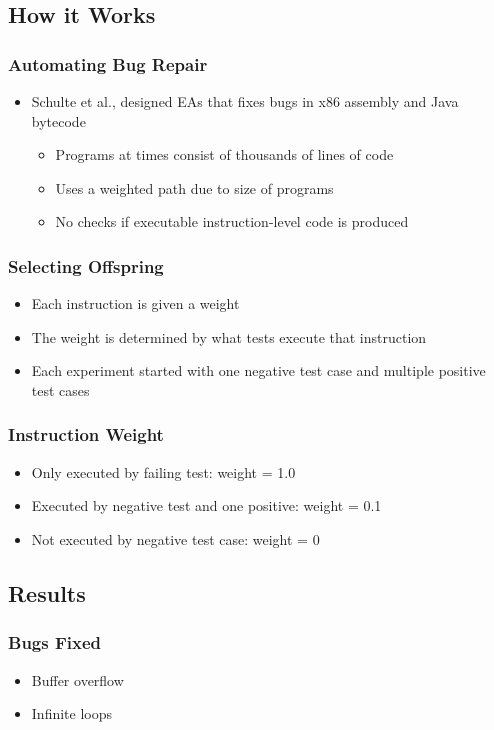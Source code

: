\documentclass{beamer}
\begin{document}
\subsection{How it Works}
\begin{frame}
  \frametitle{Automating Bug Repair}
  \begin{itemize}
  \item Schulte et al., designed EAs that fixes bugs in x86 assembly and Java bytecode
  \\
  \begin{itemize}
   \item Programs at times consist of thousands of lines of code
  \item Uses a weighted path due to size of programs
  \item No checks if executable instruction-level code is produced
  \end{itemize}

  \end{itemize}
\end{frame}

\begin{frame}
  \frametitle{Selecting Offspring}
  \begin{itemize}
  \item Each instruction is given a weight
  \item The weight is determined by what tests execute that instruction
  \item Each experiment started with one negative test case and multiple positive test cases
  \end{itemize}
\end{frame}

\begin{frame}
  \frametitle{Instruction Weight}
  
    \begin{itemize}
  	\item Only executed by failing test: weight = 1.0
  	\item Executed by negative test and one positive: weight = 0.1
  	\item Not executed by negative test case: weight = 0
  \end{itemize}
\end{frame}

\subsection[Results]{Results}
\begin{frame}


\frametitle{Bugs Fixed}
\begin{itemize}

\item Buffer overflow
\item Infinite loops
\end{itemize}
\end{frame}
\end{document}
